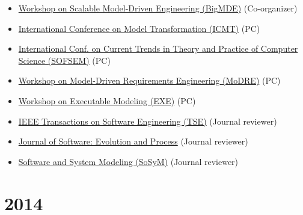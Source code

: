\begin{itemize}
\tightlist
\item
  \href{https://big-mde.github.io/2015.html}{Workshop on Scalable
  Model-Driven Engineering (BigMDE)} (Co-organizer)
\item
  \href{http://www.di.univaq.it/diruscio/sites/ICMT2015/}{International
  Conference on Model Transformation (ICMT)} (PC)
\item
  \href{http://www.sofsem.cz/sofsem15/}{International Conf. on Current
  Trends in Theory and Practice of Computer Science (SOFSEM)} (PC)
\item
  \href{http://www.modre2015.ece.mcgill.ca/}{Workshop on Model-Driven
  Requirements Engineering (MoDRE)} (PC)
\item
  \href{http://www.modelexecution.org/?page_id=1619}{Workshop on
  Executable Modeling (EXE)} (PC)
\item
  \href{https://www.computer.org/web/tse;jsessionid=6afd856a99689b17c0c58edc329c}{IEEE
  Transactions on Software Engineering (TSE)} (Journal reviewer)
\item
  \href{http://onlinelibrary.wiley.com/journal/10.1002/(ISSN)2047-7481}{Journal
  of Software: Evolution and Process} (Journal reviewer)
\item
  \href{http://www.sosym.org/}{Software and System Modeling (SoSyM)}
  (Journal reviewer)
\end{itemize}

\hypertarget{section-6}{%
\section{2014}\label{section-6}}

